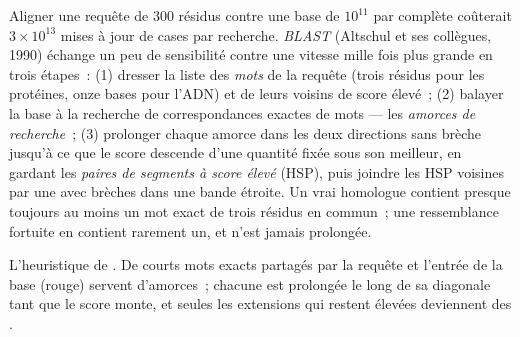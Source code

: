 \begin{definition}[BLAST]\label{def:b3:bioinformatics:blast}
Aligner une requête de \num{300} résidus contre une base de $10^{11}$
par  complète coûterait $3\times 10^{13}$ mises
à jour de cases par recherche. \emph{BLAST} (Altschul et ses collègues,
1990) échange un peu de sensibilité contre une vitesse mille fois plus
grande en trois étapes~: (1) dresser la liste des \emph{mots} de la
requête (trois résidus pour les protéines, onze bases pour l'ADN) et de
leurs voisins de score élevé~; (2) balayer la base à la recherche de
correspondances exactes de mots --- les \emph{amorces de recherche}~;
(3) prolonger chaque amorce dans les deux directions sans brèche
jusqu'à ce que le score descende d'une quantité fixée sous son
meilleur, en gardant les \emph{paires de segments à score élevé}
(HSP), puis joindre les HSP voisines par une 
avec brèches dans une bande étroite. Un vrai homologue contient presque
toujours au moins un mot exact de trois résidus en commun~; une
ressemblance fortuite en contient rarement un, et n'est jamais
prolongée.
\end{definition}

\begin{omfigure}

{\small L'heuristique de . De courts mots exacts partagés par la
requête et l'entrée de la base (rouge) servent d'amorces~; chacune est
prolongée le long de sa diagonale tant que le score monte, et seules
les extensions qui restent élevées deviennent des .}
\end{omfigure}

